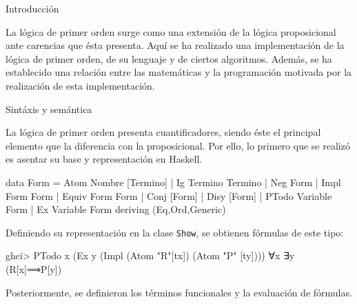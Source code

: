 \documentclass[final]{beamer}
\newlength{\onecolwid}
\begin{document}
\begin{frame}[t,fragile]
\begin{columns}[t]
\begin{column}{\onecolwid}
\begin{block}{Introducción}

  La lógica de primer orden surge como una extensión de la lógica proposicional
  ante carencias que ésta presenta. Aquí se ha realizado una implementación
  de la lógica de primer orden, de su lenguaje y de ciertos algoritmos.
  Además, se ha establecido una relación entre las matemáticas y la
  programación motivada por la realización de esta implementación.
  

\end{block}

\begin{block}{Sintáxis y semántica}

  La lógica de primer orden presenta cuantificadores, siendo éste el principal elemento
  que la diferencia con la proposicional. Por ello, lo primero que se realizó es
  asentar su base y representación en Haskell.

\begin{code}
data Form = Atom Nombre [Termino]
          | Ig Termino Termino
          | Neg Form
          | Impl Form Form
          | Equiv Form Form
          | Conj [Form]
          | Disy [Form]
          | PTodo Variable Form
          | Ex Variable Form
  deriving (Eq,Ord,Generic)  
\end{code}

Definiendo su representación en la clase \texttt{Show}, se obtienen fórmulas de este tipo:

\begin{sesion}
ghci> PTodo x (Ex y (Impl (Atom "R"[tx]) (Atom "P" [ty])))
∀x ∃y (R[x]⟹P[y])
\end{sesion}

Posteriormente, se definieron los términos funcionales y la
evaluación de fórmulas.


\end{block}
\end{column}
\end{columns}
\end{frame}
\end{document}
